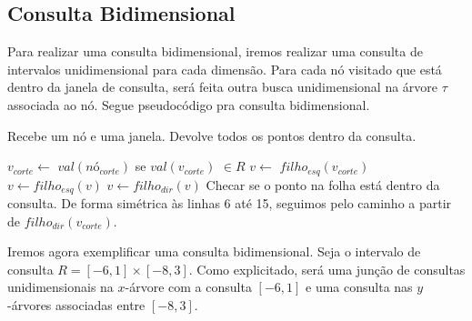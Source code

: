 \subsection{Consulta Bidimensional}

Para realizar uma consulta bidimensional, iremos realizar uma consulta de intervalos unidimensional para cada dimensão. Para cada nó visitado que está dentro da janela de consulta, será feita outra busca unidimensional na árvore $\tau$ associada ao nó. Segue pseudocódigo pra consulta bidimensional.

\begin{algorithm}[h!]
    \caption{Recebe um nó e uma janela. Devolve todos os pontos dentro da consulta.}
    \begin{algorithmic}[1]
        \State $v_{corte} \leftarrow$ 
            \Return $val(nó_{corte})$ se $val(v_{corte})$ $\in R$
        \Else
            \State $v \leftarrow $ $filho_{esq}(v_{corte})$
                    \State {}
                    \State $v \leftarrow filho_{esq}(v)$
                \Else
                    \State $v \leftarrow filho_{dir}(v)$
                \EndIf
            \EndWhile
            \State Checar se o ponto na folha está dentro da consulta.
            \State De forma simétrica às linhas 6 até 15, seguimos pelo caminho a partir de $filho_{dir}(v_{corte})$.
        \EndIf
    \EndFunction
    \end{algorithmic}
\end{algorithm}


Iremos agora exemplificar uma consulta bidimensional. Seja o intervalo de consulta $R = [-6, 1] \times [-8, 3]$. Como explicitado, será uma junção de consultas unidimensionais na $x$-árvore com a consulta $[-6,1]$ e uma consulta nas $y$-árvores associadas entre $[-8,3]$.


